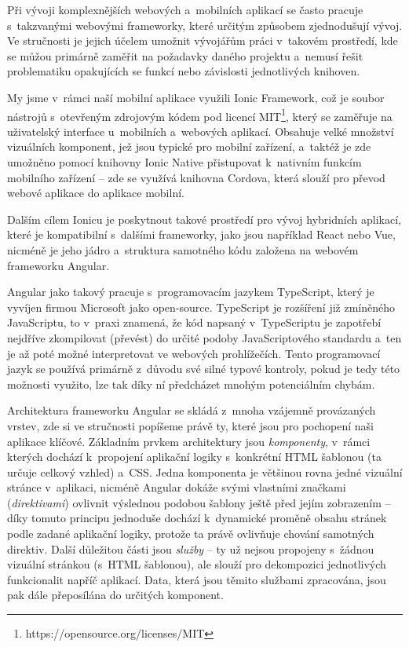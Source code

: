 Při vývoji komplexnějších webových a~mobilních aplikací se často pracuje
s~takzvanými webovými frameworky, které určitým způsobem zjednodušují
vývoj. Ve stručnosti je jejich účelem umožnit vývojářům práci v~takovém
prostředí, kde se můžou primárně zaměřit na požadavky daného projektu
a~nemusí řešit problematiku opakujících se funkcí nebo závislosti
jednotlivých knihoven.

My jsme v~rámci naší mobilní aplikace využili Ionic Framework, což je
soubor nástrojů s~otevřeným zdrojovým kódem pod licencí
MIT\footnote{https://opensource.org/licenses/MIT}, který se zaměřuje na
uživatelský interface u~mobilních a~webových aplikací. Obsahuje velké
množství vizuálních komponent, jež jsou typické pro mobilní zařízení,
a~taktéž je zde umožněno pomocí knihovny Ionic Native přistupovat
k~nativním funkcím mobilního zařízení -- zde se využívá knihovna Cordova,
která slouží pro převod webové aplikace do aplikace mobilní.
\parencite{cordova}

Dalším cílem Ionicu je poskytnout takové prostředí pro vývoj hybridních
aplikací, které je kompatibilní s~dalšími frameworky, jako jsou
například React nebo Vue, nicméně je jeho jádro a~struktura samotného
kódu založena na webovém frameworku Angular.~\parencite{ionic}

Angular jako takový pracuje s~programovacím jazykem TypeScript, který je
vyvíjen firmou Microsoft jako open-source. TypeScript je rozšíření již
zmíněného JavaScriptu, to v~praxi znamená, že kód napsaný v~TypeScriptu
je zapotřebí nejdříve zkompilovat (převést) do určité podoby
JavaScriptového standardu a~ten je až poté možné interpretovat ve
webových prohlížečích. Tento programovací jazyk se používá primárně
z~důvodu své silné typové kontroly, pokud je tedy této možnosti využito,
lze tak díky ní předcházet mnohým potenciálním chybám.
\parencite{typescript}

Architektura frameworku Angular se skládá z~mnoha vzájemně provázaných
vrstev, zde si ve stručnosti popíšeme právě ty, které jsou pro pochopení
naši aplikace klíčové. Základním prvkem architektury jsou
\emph{komponenty}, v~rámci kterých dochází k~propojení aplikační logiky
s~konkrétní HTML šablonou (ta určuje celkový vzhled) a~CSS. Jedna
komponenta je většinou rovna jedné vizuální stránce v~aplikaci, nicméně
Angular dokáže svými vlastními značkami (\emph{direktivami}) ovlivnit
výslednou podobou šablony ještě před jejím zobrazením -- díky tomuto
principu jednoduše dochází k~dynamické proměně obsahu stránek podle
zadané aplikační logiky, protože ta právě ovlivňuje chování samotných
direktiv. Další důležitou části jsou \emph{služby} -- ty už nejsou
propojeny s~žádnou vizuální stránkou (s~HTML šablonou), ale slouží pro
dekompozici jednotlivých funkcionalit napříč aplikací. Data, která jsou
těmito službami zpracována, jsou pak dále přeposílána do určitých
komponent.~\parencite{angulararchitecture}

